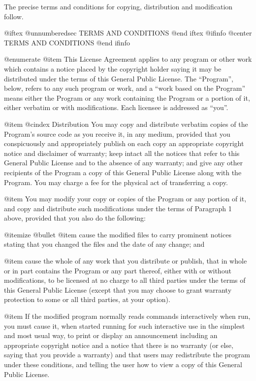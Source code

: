   The precise terms and conditions for copying, distribution and
modification follow.

@iftex
@unnumberedsec TERMS AND CONDITIONS
@end iftex
@ifinfo
@center TERMS AND CONDITIONS
@end ifinfo

@enumerate
@item
This License Agreement applies to any program or other work which
contains a notice placed by the copyright holder saying it may be
distributed under the terms of this General Public License.  The
``Program'', below, refers to any such program or work, and a ``work based
on the Program'' means either the Program or any work containing the
Program or a portion of it, either verbatim or with modifications.  Each
licensee is addressed as ``you''.

@item
@cindex Distribution
You may copy and distribute verbatim copies of the Program's source
code as you receive it, in any medium, provided that you conspicuously and
appropriately publish on each copy an appropriate copyright notice and
disclaimer of warranty; keep intact all the notices that refer to this
General Public License and to the absence of any warranty; and give any
other recipients of the Program a copy of this General Public License
along with the Program.  You may charge a fee for the physical act of
transferring a copy.

@item
You may modify your copy or copies of the Program or any portion of
it, and copy and distribute such modifications under the terms of Paragraph
1 above, provided that you also do the following:

@itemize @bullet
@item
cause the modified files to carry prominent notices stating that
you changed the files and the date of any change; and

@item
cause the whole of any work that you distribute or publish, that
in whole or in part contains the Program or any part thereof, either
with or without modifications, to be licensed at no charge to all
third parties under the terms of this General Public License (except
that you may choose to grant warranty protection to some or all
third parties, at your option).

@item
If the modified program normally reads commands interactively when
run, you must cause it, when started running for such interactive use
in the simplest and most usual way, to print or display an
announcement including an appropriate copyright notice and a notice
that there is no warranty (or else, saying that you provide a
warranty) and that users may redistribute the program under these
conditions, and telling the user how to view a copy of this General
Public License.

